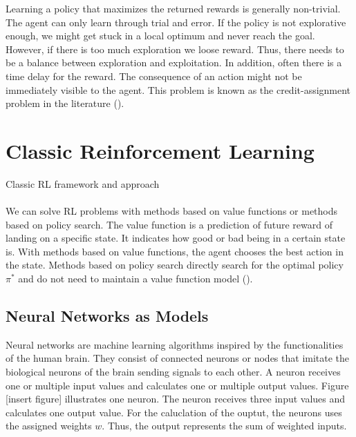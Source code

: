 Learning a policy that maximizes the returned rewards is generally non-trivial. The agent can only learn through trial and error. If the policy is not explorative enough, we might get stuck in a local optimum and never reach the goal. However, if there is too much exploration we loose reward. Thus, there needs to be a balance between exploration and exploitation. In addition, often there is a time delay for the reward. The consequence of an action might not be immediately visible to the agent. This problem is known as the credit-assignment problem in the literature (\cite{sutton2018reinforcement}).

\section{Classic Reinforcement Learning}
Classic RL framework and approach \\ \\
We can solve RL problems with methods based on value functions or methods based on policy search. The value function is a prediction of future reward of landing on a specific state. It indicates how good or bad being in a certain state is. With methods based on value functions, the agent chooses the best action in the state. Methods based on policy search directly search for the optimal policy $\pi^*$ and do not need to maintain a value function model (\cite{8103164}).

\subsection{Neural Networks as Models}
Neural networks are machine learning algorithms inspired by the functionalities of the human brain. They consist of connected neurons or nodes that imitate the biological neurons of the brain sending signals to each other. A neuron receives one or multiple input values and calculates one or multiple output values. Figure [insert figure] illustrates one neuron. The neuron receives three input values and calculates one output value. For the caluclation of the ouptut, the neurons uses the assigned weights $w$. Thus, the output represents the sum of weighted inputs.

